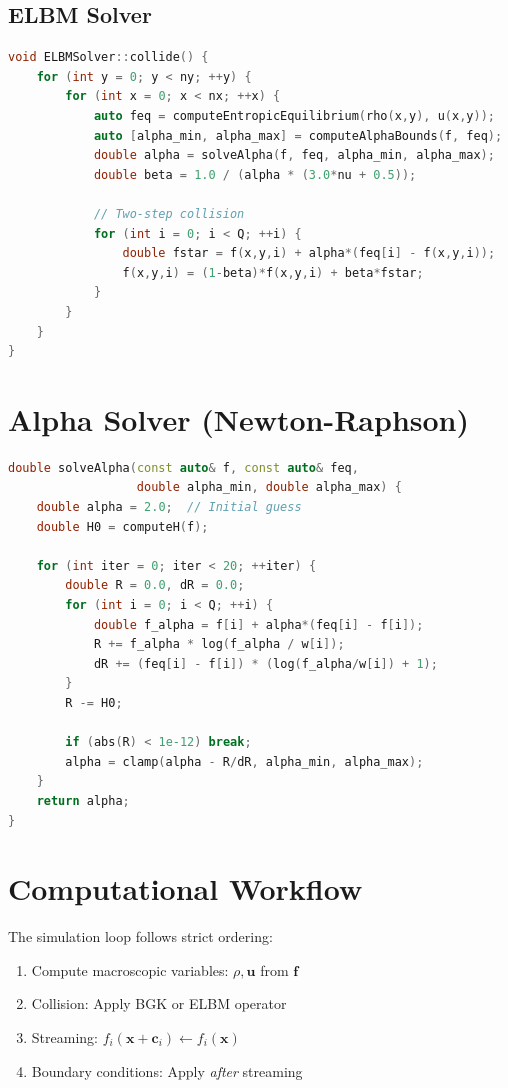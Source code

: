 \subsection{ELBM Solver}

\begin{lstlisting}[language=C++]
void ELBMSolver::collide() {
    for (int y = 0; y < ny; ++y) {
        for (int x = 0; x < nx; ++x) {
            auto feq = computeEntropicEquilibrium(rho(x,y), u(x,y));
            auto [alpha_min, alpha_max] = computeAlphaBounds(f, feq);
            double alpha = solveAlpha(f, feq, alpha_min, alpha_max);
            double beta = 1.0 / (alpha * (3.0*nu + 0.5));

            // Two-step collision
            for (int i = 0; i < Q; ++i) {
                double fstar = f(x,y,i) + alpha*(feq[i] - f(x,y,i));
                f(x,y,i) = (1-beta)*f(x,y,i) + beta*fstar;
            }
        }
    }
}
\end{lstlisting}

\section{Alpha Solver (Newton-Raphson)}

\begin{lstlisting}[language=C++]
double solveAlpha(const auto& f, const auto& feq,
                  double alpha_min, double alpha_max) {
    double alpha = 2.0;  // Initial guess
    double H0 = computeH(f);

    for (int iter = 0; iter < 20; ++iter) {
        double R = 0.0, dR = 0.0;
        for (int i = 0; i < Q; ++i) {
            double f_alpha = f[i] + alpha*(feq[i] - f[i]);
            R += f_alpha * log(f_alpha / w[i]);
            dR += (feq[i] - f[i]) * (log(f_alpha/w[i]) + 1);
        }
        R -= H0;

        if (abs(R) < 1e-12) break;
        alpha = clamp(alpha - R/dR, alpha_min, alpha_max);
    }
    return alpha;
}
\end{lstlisting}

\section{Computational Workflow}

The simulation loop follows strict ordering:
\begin{enumerate}
    \item Compute macroscopic variables: $\rho, \mathbf{u}$ from $\mathbf{f}$
    \item Collision: Apply BGK or ELBM operator
    \item Streaming: $f_i(\mathbf{x}+\mathbf{c}_i) \leftarrow f_i(\mathbf{x})$
    \item Boundary conditions: Apply \textit{after} streaming
\end{enumerate}

